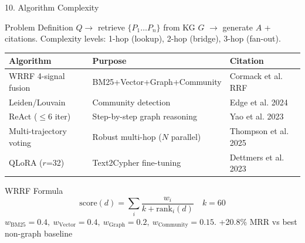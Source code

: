 \documentclass[aspectratio=169]{beamer}
\newcommand{\pos}[1]{\textcolor{positive}{#1}}
\begin{document}
\begin{frame}[shrink=8]{10. Algorithm Complexity}
\begin{alertblock}{Problem Definition}
{\small $Q \rightarrow$ retrieve $\{P_1 \ldots P_n\}$ from KG $G$
$\rightarrow$ generate $A$ + citations.
Complexity levels: 1-hop (lookup), 2-hop (bridge), 3-hop (fan-out).}
\end{alertblock}

\begin{tabular}{@{}lll@{}}
\toprule
\textbf{Algorithm} & \textbf{Purpose} & \textbf{Citation} \\
\midrule
WRRF 4-signal fusion    & BM25+Vector+Graph+Community     & Cormack et al. RRF \\
Leiden/Louvain          & Community detection              & Edge et al. 2024 \\
ReAct ($\leq$6 iter)    & Step-by-step graph reasoning     & Yao et al. 2023 \\
Multi-trajectory voting & Robust multi-hop ($N$ parallel)  & Thompson et al. 2025 \\
QLoRA ($r$=32)          & Text2Cypher fine-tuning          & Dettmers et al. 2023 \\
\bottomrule
\end{tabular}

\begin{block}{WRRF Formula}
\[
  \text{score}(d) = \sum_{i} \frac{w_i}{k + \text{rank}_i(d)} \quad k=60
\]
{\small $w_\text{BM25}=0.4,\ w_\text{Vector}=0.4,\ w_\text{Graph}=0.2,\
w_\text{Community}=0.15$. \quad
\pos{+20.8\% MRR vs best non-graph baseline \checkmark}}
\end{block}
\end{frame}
\end{document}
